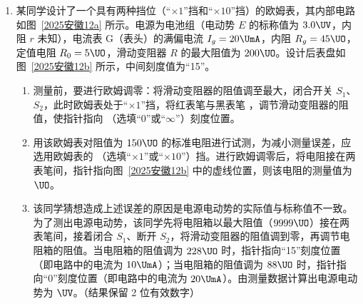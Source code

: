 \documentclass[\gkver]{gaokaozhenti}
\begin{document}
\begin{enumerate}
\item
某同学设计了一个具有两种挡位（“$\times 1$”挡和“$\times 10$”挡）的欧姆表，其内部电路如图~\ref{2025安徽12a} 所示。电源为电池组（电动势 $E$ 的标称值为 $3.0 \UV$，内阻 $r$ 未知），电流表 G（表头）的满偏电流 $I_{g} = 20 \UmA$，内阻 $R_{g} = 45 \UO$，定值电阻 $R_{0} = 5 \UO$，滑动变阻器 $R$ 的最大阻值为 $200 \UO$。设计后表盘如图~\ref{2025安徽12b} 所示，中间刻度值为“15”。
\begin{enumerate}
\item
测量前，要进行欧姆调零：将滑动变阻器的阻值调至最大，闭合开关 $S_{1}$、$S_{2}$，此时欧姆表处于“$\times 1$”挡，将红表笔与黑表笔 ，调节滑动变阻器的阻值，使指针指向 （选填“0”或“$\infty$”）刻度位置。
\item
用该欧姆表对阻值为 $150 \UO$ 的标准电阻进行试测，为减小测量误差，应选用欧姆表的 （选填“$\times 1$”或“$\times 10$”）挡。进行欧姆调零后，将电阻接在两表笔间，指针指向图~\ref{2025安徽12b} 中的虚线位置，则该电阻的测量值为  $\UO$。
\item
该同学猜想造成上述误差的原因是电源电动势的实际值与标称值不一致。为了测出电源电动势，该同学先将电阻箱以最大阻值（$9999 \UO$）接在两表笔间，接着闭合 $S_{1}$、断开 $S_{2}$，将滑动变阻器的阻值调到零，再调节电阻箱的阻值。当电阻箱的阻值调为 $228 \UO$ 时，指针指向“15”刻度位置（即电路中的电流为 $10 \UmA$）；当电阻箱的阻值调为 $88 \UO$ 时，指针指向“0”刻度位置（即电路中的电流为 $20 \UmA$）。由测量数据计算出电源电动势为  $\UV$。（结果保留 2 位有效数字）
\end{enumerate}


\end{enumerate}
\end{document}
